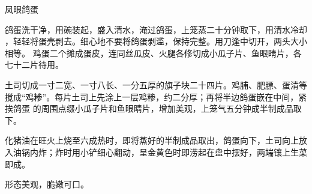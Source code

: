 \begin{recipe}{凤眼鸽蛋}

\ingredients


\cooking

\step 鸽蛋洗干净，用碗装起，盛入清水，淹过鸽蛋，上笼蒸二十分钟取下，用清水冷却
，轻轻将蛋壳剥去。细心地不要将鸽蛋剥滥，保持完整。用刀逢中切开，两头大小相等。
鸡蛋二个摊成蛋皮，连同丝瓜皮、火腿各修切成小瓜子片、鱼眼睛片，各七十二片待用。

\step 土司切成一寸二宽、一寸八长、一分五厚的旗子块二十四片。鸡脯、肥膘、蛋清等
搅成“鸡糁”。每片土司上先涂上一层鸡糁，约二分厚；再将半边鸽蛋嵌在中间，紧挨鸽蛋
的周围点缀小瓜子片和鱼眼睛片，增加美观，上笼气五分钟成半制成品取下。

\step 化猪油在旺火上烧至六成热时，即将蒸好的半制成品取出，鸽蛋向下，土司向上放
入油锅内炸；炸时用小铲细心翻动，呈金黄色时即涝起在盘中摆好，两端镶上生菜即成。

\features

形态美观，脆嫩可口。

\end{recipe}


